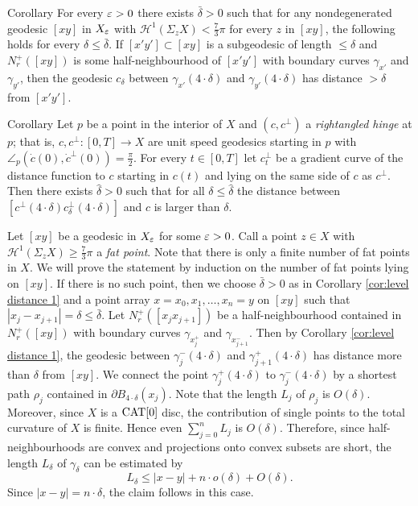 \documentclass[a4paper,10pt]{amsart}
\begin{document}
\begin{thm}{Corollary}\label{cor:level distance 1}
For every $\varepsilon>0$ there exists $\bar\delta>0$ such that for any nondegenerated geodesic $[xy]$ 
in $X_\varepsilon$ with $\mathcal{H}^1(\Sigma_z X)< \frac{7}{3}\pi$
for every $z$ in $[xy]$, the following holds for every $\delta\leq\bar\delta$. 
If $[x'y']\subset[xy]$ is a subgeodesic of length $\leq\delta$ and $N^+_r([xy])$ is some half-neighbourhood 
of $[x'y']$ with boundary curves $\gamma_{x'}$ and $\gamma_{y'}$, 
then the geodesic $c_\delta$ between  $\gamma_{x'}(4\cdot\delta)$ and $\gamma_{y'}(4\cdot\delta)$ has distance $>\delta$
from $[x'y']$.
\end{thm}

\begin{thm}{Corollary}\label{cor:level distance 2}
Let $p$ be a point in the interior of $X$ and $(c,c^\perp)$ a {\em rightangled hinge} at $p$; that is, $c,c^\perp:[0,T]\to X$ are unit speed geodesics starting in $p$
with $\angle_p(\dot c(0),\dot c^\perp (0))=\frac{\pi}{2}$. For every $t\in[0,T]$ let
$c^\perp_t$ be a gradient curve of the distance function to $c$ starting in $c(t)$ and lying on the same side
of $c$ as $c^\perp$. Then there exists $\hat\delta>0$ such that for all $\delta\leq\hat\delta$ the distance between 
$[c^\perp(4\cdot\delta)c^\perp_\delta(4\cdot\delta)]$
and $c$ is larger than $\delta$.
\end{thm}








Let $[xy]$ be a geodesic in $X_\varepsilon$ for some $\varepsilon>0$. Call a point
$z\in X$ with $\mathcal{H}^1(\Sigma_z X)\geq \frac{7}{3}\pi$ a {\em fat point}. 
Note that there is only a finite number of 
fat points in $X$. We will prove the statement by induction on  the number 
of fat points lying on $[xy]$. If there is no such point, then we choose $\bar\delta>0$ 
as in Corollary \ref{cor:level distance 1} and a point array
$x=x_0,x_1,\ldots,x_n=y$ on $[xy]$ such that $|x_j-x_{j+1}|=\delta\leq\bar\delta$. Let $N_r^ +([x_j x_{j+1}])$ 
be a half-neighbourhood contained in $N_r^ +([x y])$
with boundary curves $\gamma_{x_j^ +}$ and $\gamma_{x_{j+1}^ -}$. Then by Corollary \ref{cor:level distance 1}, 
the geodesic between $\gamma_j^ -(4\cdot\delta)$
and $\gamma_{j+1}^ +(4\cdot\delta)$ has distance more than $\delta$ from $[xy]$. We connect the point 
$\gamma_j^ +(4\cdot\delta)$ to $\gamma_j^ -(4\cdot\delta)$ by a shortest path $\rho_j$
contained in $\partial B_{4\cdot\delta}(x_j)$. Note that the length $L_j$ of $\rho_j$ is $O(\delta)$. 
Moreover, since $X$
is a $\mathop{\rm CAT}\nolimits[0]$ disc, the contribution of single points to the total curvature of $X$ is finite. Hence 
even $\sum_{j=0}^ n L_j$ is $O(\delta)$.
Therefore, since half-neighbourhoods are convex and projections onto convex subsets are short, the 
length $L_\delta$ of $\gamma_\delta$ can be
estimated by 
$$
L_\delta\leq |x-y|+n\cdot o(\delta)+O(\delta).
$$
Since $|x-y|=n\cdot\delta$, the claim follows in this case.
\end{document}
